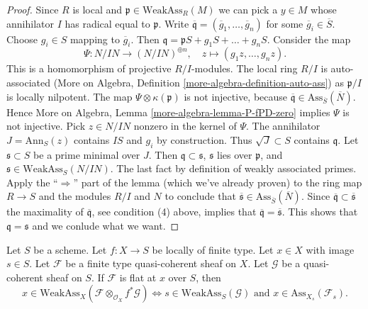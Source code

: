 \begin{proof}
\medskip\noindent
Since $R$ is local and $\mathfrak p \in \text{WeakAss}_R(M)$
we can pick a $y \in M$ whose annihilator $I$ has radical
equal to $\mathfrak p$.
Write $\overline{\mathfrak q} = (\overline{g}_1, \ldots, \overline{g}_n)$
for some $\overline{g}_i \in \overline{S}$. Choose $g_i \in S$
mapping to $\overline{g}_i$.
Then $\mathfrak q = \mathfrak pS + g_1S + \ldots + g_nS$.
Consider the map
$$
\Psi : N/IN \longrightarrow (N/IN)^{\oplus n}, \quad
z \longmapsto (g_1z, \ldots, g_nz).
$$
This is a homomorphism of projective $R/I$-modules.
The local ring $R/I$ is auto-associated
(More on Algebra, Definition \ref{more-algebra-definition-auto-ass})
as $\mathfrak p/I$ is locally nilpotent.
The map $\Psi \otimes \kappa(\mathfrak p)$ is not injective, because
$\overline{\mathfrak q} \in \text{Ass}_{\overline{S}}(\overline{N})$.
Hence More on Algebra, Lemma \ref{more-algebra-lemma-P-fPD-zero}
implies $\Psi$ is not injective. Pick $z \in N/IN$
nonzero in the kernel of $\Psi$. The annihilator $J = \text{Ann}_S(z)$
contains $IS$ and $g_i$ by construction. Thus
$\sqrt{J} \subset S$ contains $\mathfrak q$.
Let $\mathfrak s \subset S$ be a prime minimal over $J$.
Then $\mathfrak q \subset \mathfrak s$,
$\mathfrak s$ lies over $\mathfrak p$, and
$\mathfrak s \in \text{WeakAss}_S(N/IN)$.
The last fact by definition of weakly associated primes.
Apply the ``$\Rightarrow$'' part of the lemma (which we've already proven)
to the ring map $R \to S$ and the modules $R/I$ and $N$
to conclude that
$\overline{\mathfrak s} \in \text{Ass}_{\overline{S}}(\overline{N})$.
Since $\overline{\mathfrak q} \subset \overline{\mathfrak s}$
the maximality of $\overline{\mathfrak q}$, see condition (4) above,
implies that $\overline{\mathfrak q} = \overline{\mathfrak s}$.
This shows that $\mathfrak q = \mathfrak s$ and we conlude
what we want.
\end{proof}

\begin{lemma}
\label{lemma-bourbaki-finite-type-general-base-at-point}
Let $S$ be a scheme.
Let $f : X \to S$ be locally of finite type.
Let $x \in X$ with image $s \in S$.
Let $\mathcal{F}$ be a finite type quasi-coherent sheaf on $X$.
Let $\mathcal{G}$ be a quasi-coherent sheaf on $S$.
If $\mathcal{F}$ is flat at $x$ over $S$, then
$$
x \in \text{WeakAss}_X(\mathcal{F} \otimes_{\mathcal{O}_X} f^*\mathcal{G})
\Leftrightarrow
s \in \text{WeakAss}_S(\mathcal{G})
\text{ and }
x \in \text{Ass}_{X_s}(\mathcal{F}_s).
$$
\end{lemma}

